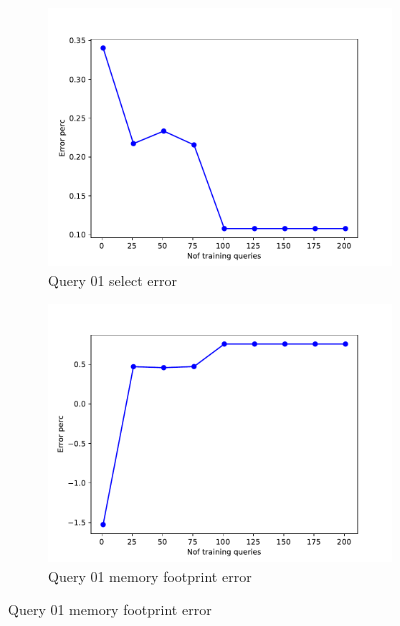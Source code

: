 \begin{figure}[!htb]

  \begin{subfigure}[t]{0.5\textwidth}
    \includegraphics[scale=0.4]{figs/tpch10/tpch10_sel01_error.pdf}
    \caption{Query 01 select error}
    \label{fig:tpch_sel01}
  \end{subfigure}
  \begin{subfigure}[t]{0.5\textwidth}
    \includegraphics[scale=0.4]{figs/tpch10/tpch10_q01_memerror.pdf}
    \caption{Query 01 memory footprint error}
    \label{fig:tpch_mem01}
  \end{subfigure}


\end{figure}
